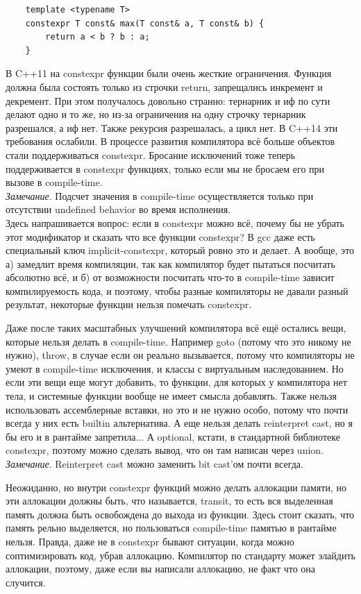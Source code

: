 \documentclass[12pt, a4paper]{article}
\begin{document}
\begin{verbatim}
	template <typename T>
	constexpr T const& max(T const& a, T const& b) {
		return a < b ? b : a;
	}
\end{verbatim}
\par В C++11 на constexpr функции были очень жесткие ограничения. Функция должна была состоять только из строчки return, запрещались инкремент и декремент. При этом получалось довольно странно: тернарник и иф по сути делают одно и то же, но из-за ограничения на одну строчку тернарник разрешался, а иф нет. Также рекурсия разрешалась, а цикл нет. В C++14 эти требования ослабили. В процессе развития компилятора всё больше объектов стали поддерживаться constexpr. Бросание исключений тоже теперь поддерживается в constexpr функциях, только если мы не бросаем его при вызове в compile-time.\\
\textit{Замечание}. Подсчет значения в compile-time осуществляется только при отсутствии undefined behavior во время исполнения.\\
Здесь напрашивается вопрос: если в constexpr можно всё, почему бы не убрать этот модификатор и сказать что все функции constexpr? В gcc даже есть специальный ключ implicit-constexpr, который ровно это и делает. А вообще, это а) замедлит время компиляции, так как компилятор будет пытаться посчитать абсолютно всё, и б) от возможности посчитать что-то в compile-time зависит компилируемость кода, и поэтому, чтобы разные компиляторы не давали разный результат, некоторые функции нельзя помечать constexpr.
\par Даже после таких масштабных улучшений компилятора всё ещё остались вещи, которые нельзя делать в compile-time. Например goto (потому что это никому не нужно), throw, в случае если он реально вызывается, потому что компиляторы не умеют в compile-time исключения, и классы с виртуальным наследованием. Но если эти вещи еще могут добавить, то функции, для которых у компилятора нет тела, и системные функции вообще не имеет смысла добавлять. Также нельзя использовать ассемблерные вставки, но это и не нужно особо, потому что почти всегда у них есть builtin альтернатива. А еще нельзя делать reinterpret cast, но я бы его и в рантайме запретила... А optional, кстати, в стандартной библиотеке constexpr, поэтому можно сделать вывод, что он там написан через union.
\\\textit{Замечание}. Reinterpret cast можно заменить bit cast'ом почти всегда.
\par Неожиданно, но внутри constexpr функций можно делать аллокации памяти, но эти аллокации должны быть, что называется, transit, то есть вся выделенная память должна быть освобождена до выхода из функции. Здесь стоит сказать, что память рельно выделяется, но пользоваться compile-time памятью в рантайме нельзя. Правда, даже не в constexpr бывают ситуации, когда можно соптимизировать код, убрав аллокацию. Компилятор по стандарту может элайдить аллокации, поэтому, даже если вы написали аллокацию, не факт что она случится.
\end{document}
